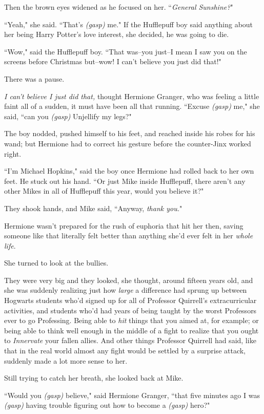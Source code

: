 Then the brown eyes widened as he focused on her. ``\emph{General Sunshine?}"

``Yeah," she said. ``That's \emph{(gasp)} me." If the Hufflepuff boy said anything about her being Harry Potter's love interest, she decided, he was going to die.

``Wow," said the Hufflepuff boy. ``That was\---you just\---I mean I saw you on the screens before Christmas but\---wow! I can't believe you just did that!"

There was a pause.

\emph{I can't believe I just did that,} thought Hermione Granger, who was feeling a little faint all of a sudden, it must have been all that running. ``Excuse \emph{(gasp)} me," she said, ``can you \emph{(gasp)} Unjellify my legs?"

The boy nodded, pushed himself to his feet, and reached inside his robes for his wand; but Hermione had to correct his gesture before the counter-Jinx worked right.

``I'm Michael Hopkins," said the boy once Hermione had rolled back to her own feet. He stuck out his hand. ``Or just Mike inside Hufflepuff, there aren't any other Mikes in all of Hufflepuff this year, would you believe it?"

They shook hands, and Mike said, ``Anyway, \emph{thank you.}"

Hermione wasn't prepared for the rush of euphoria that hit her then, saving someone like that literally felt better than anything she'd ever felt in her \emph{whole life}.

She turned to look at the bullies.

They were very big and they looked, she thought, around fifteen years old, and she was suddenly realizing just how \emph{large} a difference had sprung up between Hogwarts students who'd signed up for all of Professor Quirrell's extracurricular activities, and students who'd had years of being taught by the worst Professors ever to go Professing. Being able to \emph{hit} things that you aimed at, for example; or being able to think well enough in the middle of a fight to realize that you ought to \emph{Innervate} your fallen allies. And other things Professor Quirrell had said, like that in the real world almost any fight would be settled by a surprise attack, suddenly made a lot more sense to her.

Still trying to catch her breath, she looked back at Mike.

``Would you \emph{(gasp)} believe," said Hermione Granger, ``that five minutes ago I was \emph{(gasp)} having trouble figuring out how to become a \emph{(gasp)} hero?"

